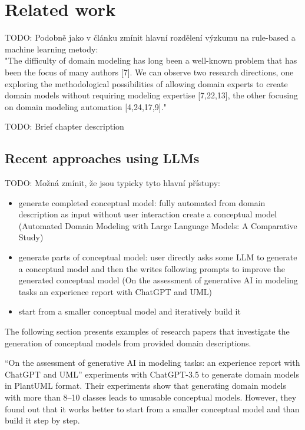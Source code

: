 \chapter{Related work}

TODO: Podobně jako v článku zmínit hlavní rozdělení výzkumu na rule-based a machine learning metody: \\

"The difficulty of domain modeling has long been a well-known problem that has been the focus of many authors [7]. We can observe two research directions, one exploring the methodological possibilities of allowing domain experts to create domain models without requiring modeling expertise [7,22,13], the other focusing on domain modeling automation [4,24,17,9]."

TODO: Brief chapter description \\


\section{Recent approaches using LLMs}

TODO: Možná zmínit, že jsou typicky tyto hlavní přístupy:
\begin{itemize}
\item generate completed conceptual model: fully automated from domain description as input without user interaction create a conceptual model (Automated Domain Modeling with Large Language Models: A Comparative Study)
\item generate parts of conceptual model: user directly asks some LLM to generate a conceptual model and then the writes following prompts to improve the generated conceptual model (On the assessment of generative AI in modeling tasks an experience report with ChatGPT and UML)
\item start from a smaller conceptual model and iteratively build it \\
\end{itemize}

The following section presents examples of research papers that investigate the generation of conceptual models from provided domain descriptions.

``On the assessment of generative AI in modeling tasks: an experience report with ChatGPT and UML'' \cite{Camara2023} experiments with ChatGPT-3.5 to generate domain models in PlantUML format. Their experiments show that generating domain models with more than 8--10 classes leads to unusable conceptual models. However, they found out that it works better to start from a smaller conceptual model and than build it step by step.

